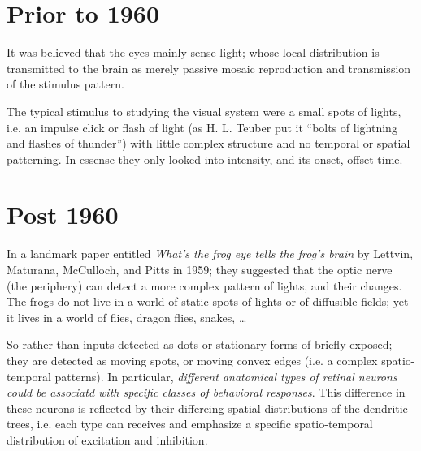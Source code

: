 \section{Prior to 1960}

It was believed that the eyes mainly sense light; whose local distribution is
transmitted to the brain as merely passive mosaic reproduction and transmission
of the stimulus pattern.

The typical stimulus to studying the visual system were a small spots of lights,
i.e. an impulse click or flash of light (as H. L. Teuber put it ``bolts of
lightning and flashes of thunder'') with little complex structure and no
temporal or spatial patterning. In essense they only looked into intensity, and
its onset, offset time.

\section{Post 1960}
\label{sec:Lettvin-what-the-frog-eye}

In a landmark paper entitled {\it What's the frog eye tells the frog's brain} by
Lettvin, Maturana, McCulloch, and Pitts in 1959; they suggested that the optic
nerve (the periphery) can detect a more complex pattern of lights, and their
changes. The frogs do not live in a world of static spots of lights or of
diffusible fields; yet it lives in a world of flies, dragon flies, snakes,
\ldots 

So rather than inputs detected as dots or stationary forms of briefly exposed;
they are detected as moving spots, or moving convex edges (i.e. a complex
spatio-temporal patterns). In particular, {\it different anatomical types of
retinal neurons could be associatd with specific classes of behavioral
responses}. This difference in these neurons is reflected by their differeing
spatial distributions of the dendritic trees, i.e. each type can receives and
emphasize a specific spatio-temporal distribution of excitation and inhibition.

